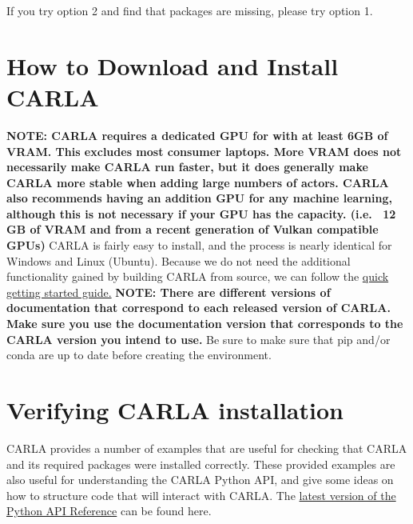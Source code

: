 \documentclass{article}
\begin{document}
If you try option 2 and find that packages are missing, please try option 1.

\section{How to Download and Install CARLA}
\label{sec:CARLAInstall}
\textbf{NOTE: CARLA requires a dedicated GPU for with at least 6GB of VRAM. This excludes most consumer laptops. More VRAM does not necessarily make CARLA run faster, but it does generally make CARLA more stable when adding large numbers of actors. CARLA also recommends having an addition GPU for any machine learning, although this is not necessary if your GPU has the capacity. (i.e. ~12 GB of VRAM and from a recent generation of Vulkan compatible GPUs)}
CARLA is fairly easy to install, and the process is nearly identical for Windows and Linux (Ubuntu). Because we do not need the additional functionality gained by building CARLA from source, we can follow the \href{https://carla.readthedocs.io/en/latest/start_quickstart/}{quick getting started guide.} \textbf{NOTE: There are different versions of documentation that correspond to each released version of CARLA. Make sure you use the documentation version that corresponds to the CARLA version you intend to use.} Be sure to make sure that pip and/or conda are up to date before creating the environment. \\


\section{Verifying CARLA installation}
\label{sec:verifyInstall}
CARLA provides a number of examples that are useful for checking that CARLA and its required packages were installed correctly. These provided examples are also useful for understanding the CARLA Python API, and give some ideas on how to structure code that will interact with CARLA. The \href{https://carla.readthedocs.io/en/latest/python_api/}{latest version of the Python API Reference} can be found here. 
\end{document}
